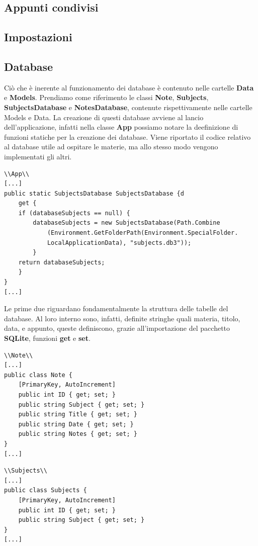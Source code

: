 \documentclass[a4paper, 50pt, twoside]{article}
\begin{document}
\subsection{Appunti condivisi}
\subsection{Impostazioni}
\subsection{Database}
Ciò che è inerente al funzionamento dei database è contenuto nelle cartelle \textbf{Data} e \textbf{Models}. Prendiamo come riferimento le classi \textbf{Note}, \textbf{Subjects}, \textbf{SubjectsDatabase} e \textbf{NotesDatabase}, contenute rispettivamente nelle cartelle Models e Data.
La creazione di questi database avviene al lancio dell'applicazione, infatti nella classe \textbf{App} possiamo notare la deefinizione di funzioni statiche per la creazione dei database. Viene riportato il codice relativo al database utile ad ospitare le materie, ma allo stesso modo vengono implementati gli altri.

\begin{lstlisting}
\\App\\
[...]
public static SubjectsDatabase SubjectsDatabase {d
	get {
	if (databaseSubjects == null) {
		databaseSubjects = new SubjectsDatabase(Path.Combine
			(Environment.GetFolderPath(Environment.SpecialFolder.
			LocalApplicationData), "subjects.db3"));
		}
	return databaseSubjects;
	}
}
[...]
\end{lstlisting}

Le prime due riguardano fondamentalmente la struttura delle tabelle del database. Al loro interno sono, infatti, definite stringhe quali materia, titolo, data, e appunto, queste definiscono, grazie all'importazione del pacchetto \textbf{SQLite}, funzioni \textbf{get} e \textbf{set}.

\begin{lstlisting}
\\Note\\
[...]
public class Note {
	[PrimaryKey, AutoIncrement]
	public int ID { get; set; }
	public string Subject { get; set; }
	public string Title { get; set; }
	public string Date { get; set; }
	public string Notes { get; set; }
}
[...]
\end{lstlisting}

\begin{lstlisting}
\\Subjects\\
[...]
public class Subjects {
	[PrimaryKey, AutoIncrement]
	public int ID { get; set; }
	public string Subject { get; set; }
}
[...]
\end{lstlisting}
\end{document}

